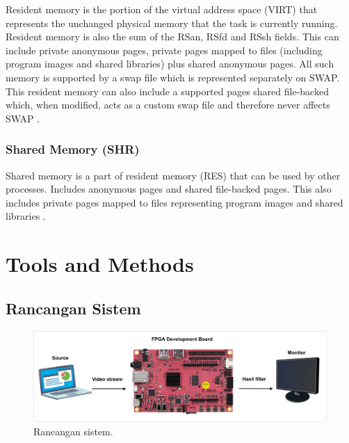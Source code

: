 Resident memory is the portion of the virtual address space (VIRT) that represents the unchanged physical memory that the task is currently running. Resident memory is also the sum of the RSan, RSfd and RSsh fields. This can include private anonymous pages, private pages mapped to files (including program images and shared libraries) plus shared anonymous pages. All such memory is supported by a swap file which is represented separately on SWAP. This resident memory can also include a supported pages shared file-backed which, when modified, acts as a custom swap file and therefore never affects SWAP \cite{manual:linux}.

\subsubsection{Shared Memory (SHR)}


Shared memory is a part of resident memory (RES) that can be used by other processes. Includes anonymous pages and shared file-backed pages. This also includes private pages mapped to files representing program images and shared libraries \cite{manual:linux}.



\section{Tools and Methods}

\subsection{Rancangan Sistem}
\begin{figure}[ht]
    \includegraphics[width=1\linewidth, center]{images/rancangan-sistem2.png}
    \caption{Rancangan sistem.}
    \label{fig:rancangan-sistem}
\end{figure}

